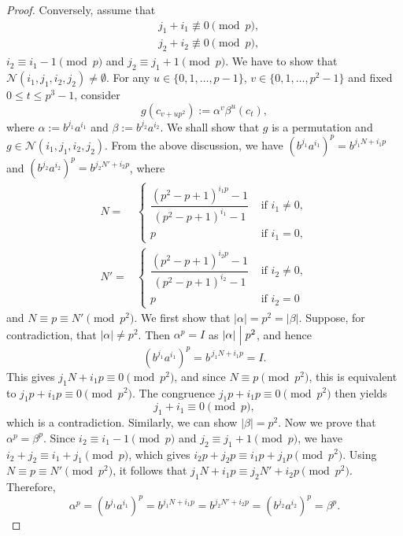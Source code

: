 \documentclass[10pt,a4paper]{amsart}
\begin{document}
\begin{proof}
Conversely, assume that \begin{equation*}
\begin{split}
& j_1+i_1 \not \equiv  0  \pmod p,\\& 
  j_2 +i_2\not \equiv  0 \pmod p,
\end{split}
\end{equation*}
 $i_2\equiv i_1-1 \pmod  p$ and $j_2 \equiv j_1+1 \pmod  p$. We have to show that $\mathcal{N}(i_1,j_1,i_2,j_2) \neq \emptyset$.  
For any $u \in \{0,1,\ldots,p-1\}$, $v \in \{0,1,\ldots,p^2-1\}$ and fixed $ 0 \leq t \leq p^3-1$, consider 
 \begin{equation}\label{tempe3}
 g(c_{v+up^2}):=\alpha^{v}\beta^{u}(c_t),
 \end{equation}
 where $\alpha:=b^{j_1}a^{i_1}$ and $\beta:=b^{j_2}a^{i_2}$. We shall show that $g$ is a permutation and $g \in \mathcal{N}(i_1,j_1,i_2,j_2)$. From the above discussion, we have $(b^{j_1}a^{i_1})^p=b^{j_1N+i_1p}$ and $ (b^{j_2}a^{i_2})^p=b^{j_2N'+i_2p}$, where 
$$
\begin{aligned}
N=&\begin{cases} \dfrac{(p^2-p+1)^{i_1p}-1}{(p^2-p+1)^{i_1}-1} & \text{ if } i_1 \neq 0,\\p 
 & \text{ if } i_1=0, \end{cases}\\
N'=&\begin{cases} \dfrac{(p^2-p+1)^{i_2p}-1}{(p^2-p+1)^{i_2}-1} & \text{ if } i_2 \neq 0,\\p 
 & \text{ if } i_2=0\end{cases}
 \end{aligned}$$
  and $N \equiv p \equiv N' \pmod {p^2}$. We first show that $|\alpha|=p^2=|\beta|$.
  Suppose, for contradiction, that $|\alpha|\neq p^{2}$. Then $\alpha^{p}=I$ as $|\alpha| \Bigm| p^2$, and hence
\[
(b^{j_1}a^{i_1})^{p}=b^{\,j_1N+i_1p}=I.
\]
This gives $j_1N+i_1p \equiv 0 \pmod{p^{2}}$, and since $N \equiv p \pmod{p^{2}}$,
this is equivalent to
$
j_1p+i_1p \equiv 0 \pmod{p^{2}}.
$
The congruence $j_1p+i_1p \equiv 0 \pmod{p^{2}}$ then yields
\[
j_1+i_1 \equiv 0 \pmod{p},
\]
which is a contradiction. Similarly, we can show $|\beta|=p^2$. Now we prove that $\alpha^p=\beta^p$. Since $i_2\equiv i_1-1 \pmod  p$ and $j_2 \equiv j_1+1 \pmod  p$, we have $i_2+j_2 \equiv i_1+j_1 \pmod  p$, which gives  $i_2p+j_2p \equiv i_1p+j_1p \pmod {p^2}$. Using $N \equiv p \equiv N' \pmod {p^2}$, it follows that  $j_1N+i_1p \equiv j_2N'+i_2p \pmod {p^2}$. Therefore, 
$$\alpha^p=(b^{j_1}a^{i_1})^p=b^{j_1N+i_1p}=b^{j_2N'+i_2p}=(b^{j_2}a^{i_2})^p=\beta^p.$$

\end{proof}
\end{document}
